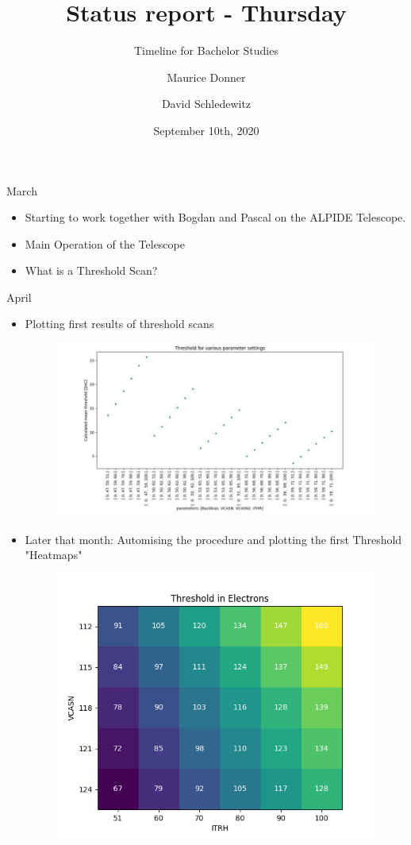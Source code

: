 \documentclass{beamer}
\title{\texorpdfstring{\color{blue!50!black}\textbf{Status report - Thursday}}{}}
\subtitle{Timeline for Bachelor Studies}
\author{Maurice Donner \and David Schledewitz}
\date{September 10th, 2020}
\begin{document}
\maketitle

\begin{frame}{March}
    \begin{itemize}
	\item Starting to work together with Bogdan and Pascal on the ALPIDE
	    Telescope.
	\item Main Operation of the Telescope
	\item What is a Threshold Scan?
    \end{itemize}
\end{frame}

\begin{frame}{April}
    \begin{itemize}
	\item Plotting first results of threshold scans
	    \begin{figure}[H]
		\centering
		\includegraphics[width=.4\textwidth]{DavidFirst.jpg}
	    \end{figure}
	\item Later that month: Automising the procedure and plotting the first
	    Threshold "Heatmaps"
	    \begin{figure}[H]
		\centering
		\includegraphics[width=.3\textwidth]{MauriceFirstMaps.png}
	    \end{figure}
    \end{itemize}
\end{frame}
\end{document}
